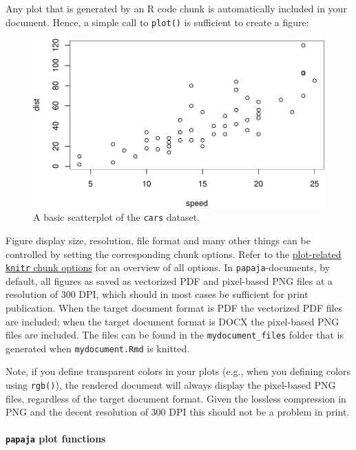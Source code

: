 \documentclass[man,floatsintext]{apa6}
\let\oldparagraph\paragraph
\renewcommand{\paragraph}[1]{\oldparagraph{#1}\mbox{}}
\theoremstyle{definition}
\theoremstyle{definition}
\theoremstyle{definition}
\theoremstyle{remark}
\begin{document}
Any plot that is generated by an R code chunk is automatically included
in your document. Hence, a simple call to \texttt{plot()} is sufficient
to create a figure:



\begin{figure}
\centering
\includegraphics{paper_files/figure-latex/simple-base-plot-1.pdf}
\caption{\label{fig:simple-base-plot}A basic scatterplot of the \texttt{cars} dataset.}
\end{figure}

Figure display size, resolution, file format and many other things can
be controlled by setting the corresponding chunk options. Refer to the
\href{https://yihui.name/knitr/options/\#plots}{plot-related
\texttt{knitr} chunk options} for an overview of all options. In
\texttt{papaja}-documents, by default, all figures as saved as
vectorized PDF and pixel-based PNG files at a resolution of 300 DPI,
which should in most cases be sufficient for print publication. When the
target document format is PDF the vectorized PDF files are included;
when the target document format is DOCX the pixel-based PNG files are
included. The files can be found in the \texttt{mydocument\_files}
folder that is generated when \texttt{mydocument.Rmd} is knitted.

Note, if you define transparent colors in your plots (e.g., when you
defining colors using \texttt{rgb()}), the rendered document will always
display the pixel-based PNG files, regardless of the target document
format. Given the lossless compression in PNG and the decent resolution
of 300 DPI this should not be a problem in print.

\paragraph{\texorpdfstring{\texttt{papaja} plot
functions}{papaja plot functions}}\label{papaja-plot-functions}
\end{document}
